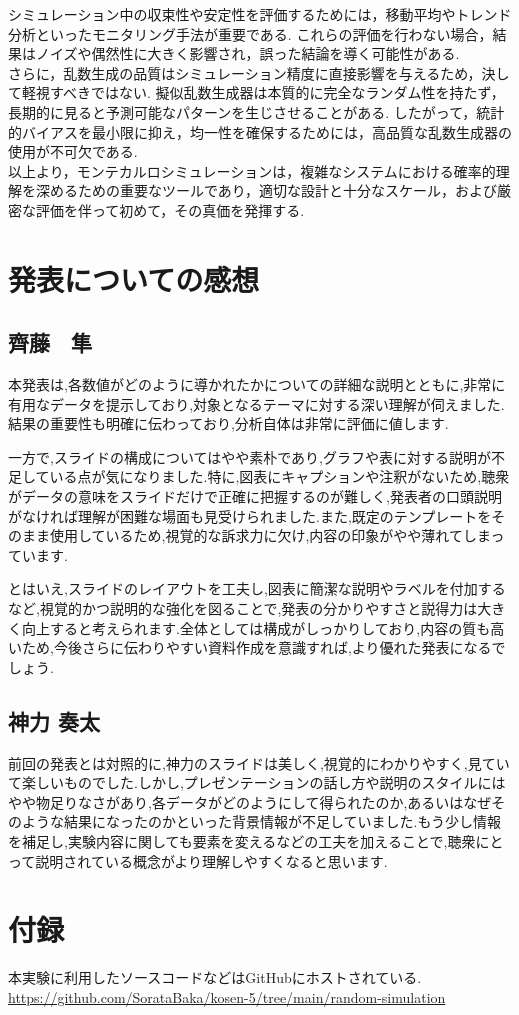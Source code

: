\documentclass[a4j, 12pt ]{jarticle}
\begin{document}
シミュレーション中の収束性や安定性を評価するためには，移動平均やトレンド分析といったモニタリング手法が重要である. これらの評価を行わない場合，結果はノイズや偶然性に大きく影響され，誤った結論を導く可能性がある. \\

さらに，乱数生成の品質はシミュレーション精度に直接影響を与えるため，決して軽視すべきではない. 擬似乱数生成器は本質的に完全なランダム性を持たず，長期的に見ると予測可能なパターンを生じさせることがある. したがって，統計的バイアスを最小限に抑え，均一性を確保するためには，高品質な乱数生成器の使用が不可欠である. \\

以上より，モンテカルロシミュレーションは，複雑なシステムにおける確率的理解を深めるための重要なツールであり，適切な設計と十分なスケール，および厳密な評価を伴って初めて，その真価を発揮する. \\
\section{発表についての感想}
\subsection{齊藤　隼}
本発表は,各数値がどのように導かれたかについての詳細な説明とともに,非常に有用なデータを提示しており,対象となるテーマに対する深い理解が伺えました.結果の重要性も明確に伝わっており,分析自体は非常に評価に値します.

一方で,スライドの構成についてはやや素朴であり,グラフや表に対する説明が不足している点が気になりました.特に,図表にキャプションや注釈がないため,聴衆がデータの意味をスライドだけで正確に把握するのが難しく,発表者の口頭説明がなければ理解が困難な場面も見受けられました.また,既定のテンプレートをそのまま使用しているため,視覚的な訴求力に欠け,内容の印象がやや薄れてしまっています.

とはいえ,スライドのレイアウトを工夫し,図表に簡潔な説明やラベルを付加するなど,視覚的かつ説明的な強化を図ることで,発表の分かりやすさと説得力は大きく向上すると考えられます.全体としては構成がしっかりしており,内容の質も高いため,今後さらに伝わりやすい資料作成を意識すれば,より優れた発表になるでしょう.
\subsection{神力 奏太}
前回の発表とは対照的に,神力のスライドは美しく,視覚的にわかりやすく,見ていて楽しいものでした.しかし,プレゼンテーションの話し方や説明のスタイルにはやや物足りなさがあり,各データがどのようにして得られたのか,あるいはなぜそのような結果になったのかといった背景情報が不足していました.もう少し情報を補足し,実験内容に関しても要素を変えるなどの工夫を加えることで,聴衆にとって説明されている概念がより理解しやすくなると思います.
\section{付録}
本実験に利用したソースコードなどはGitHubにホストされている.
\url{https://github.com/SorataBaka/kosen-5/tree/main/random-simulation}


\end{document}

